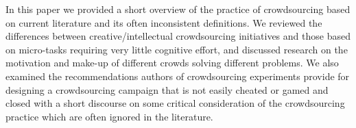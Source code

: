 \documentclass{sig-alternate}
\begin{document}
In this paper we provided a short overview of the practice of crowdsourcing
based on current literature and its often inconsistent definitions. We reviewed
the differences between creative/intellectual crowdsourcing initiatives and
those based on micro-tasks requiring very little cognitive effort, and
discussed research on the motivation and make-up of different crowds solving
different problems. We also examined the recommendations authors of
crowdsourcing experiments provide for designing a crowdsourcing campaign that
is not easily cheated or gamed and closed with a short discourse on some
critical consideration of the crowdsourcing practice which are often ignored in
the literature.



\end{document}
